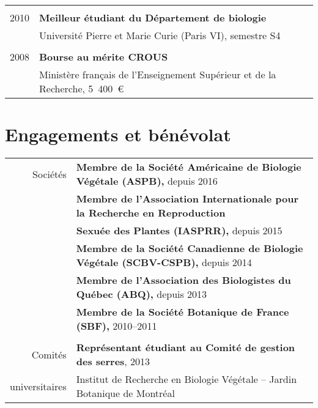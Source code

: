 \documentclass[letterpaper,10pt]{article}
\begin{document}
{\begin{tabular}{r|p{14cm}}
\multicolumn{2}{c}{} \\

2010

& \textbf{Meilleur étudiant du Département de biologie} \\
& Université Pierre et Marie Curie (Paris VI), semestre S4\\

\multicolumn{2}{c}{} \\

2008

& \textbf{Bourse au mérite CROUS} \\
& Ministère français de l'Enseignement Supérieur et de la Recherche, 5~400~€\\
\end{tabular}

\vspace{8mm}

\section{Engagements et bénévolat}
\begin{tabular}{r|p{14cm}}	
Sociétés & \textbf{Membre de la Société Américaine de Biologie Végétale (ASPB),} depuis 2016 \vspace{2mm}\\
 & \textbf{Membre de l'Association Internationale pour la Recherche en Reproduction } \\
 & \textbf{Sexuée des Plantes (IASPRR),} depuis 2015 \vspace{2mm}\\
 & \textbf{Membre de la Société Canadienne de Biologie Végétale (SCBV-CSPB),} depuis 2014 \vspace{2mm}\\
 & \textbf{Membre de l'Association des Biologistes du Québec (ABQ),} depuis 2013 \vspace{2mm}\\

 & \textbf{Membre de la Société Botanique de France (SBF),} 2010--2011\\

\multicolumn{2}{c}{} \\

Comités & \textbf{Représentant étudiant au Comité de gestion des serres}, 2013 \\
universitaires & Institut de Recherche en Biologie Végétale -- Jardin Botanique de Montréal \vspace{2mm}\\


\end{tabular}}
\end{document}
